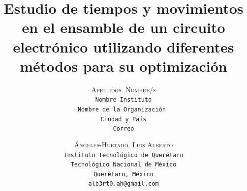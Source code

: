     \lfoot{ \thepage}
    
    \setlength{\droptitle}{-5\baselineskip} %
    \title{\textbf{Estudio de tiempos y movimientos en el ensamble de un circuito electrónico utilizando diferentes métodos para su optimización }} %
    
     \author{ 
     \textsc{Apellidos, Nombre/s}\\ 
     \texttt{ Nombre Instituto } \\ 
     \texttt{Nombre de la Organización } \\ 
     \texttt{Ciudad y País}\\ 
     \texttt{Correo} 
     \and 
     \textsc{Ángeles-Hurtado, Luis Alberto}\\ 
     \texttt{ Instituto Tecnológico de Querétaro } \\ 
     \texttt{ Tecnológico Nacional de México } \\ 
     \texttt{Querétaro, México}\\ 
     \texttt{alb3rt0.ah@gmail.com} 
    }
    
    
    
    
    \maketitle
    \thispagestyle{fancy}
    
